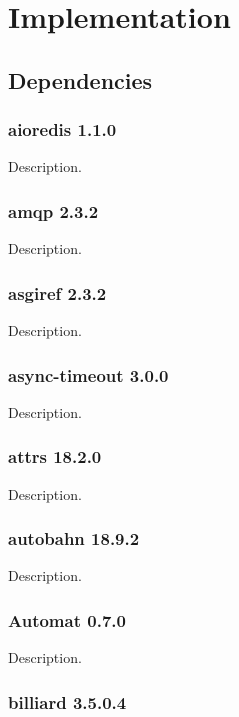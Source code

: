 \section{Implementation}

\subsection{Dependencies}

\subsubsection{aioredis 1.1.0}

Description.

\subsubsection{amqp 2.3.2}

Description.

\subsubsection{asgiref 2.3.2}

Description.

\subsubsection{async-timeout 3.0.0}

Description.

\subsubsection{attrs 18.2.0}

Description.

\subsubsection{autobahn 18.9.2}

Description.

\subsubsection{Automat 0.7.0}

Description.

\subsubsection{billiard 3.5.0.4}

